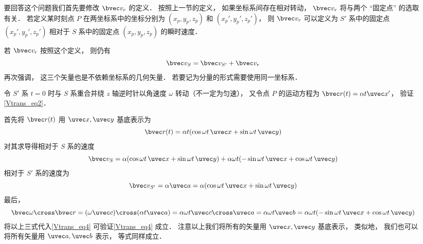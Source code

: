 要回答这个问题我们首先要修改 $\bvec v_r$ 的定义． 按照上一节的定义， 如果坐标系间存在相对转动， $\bvec v_r$ 将与两个 “固定点” 的选取有关． 若定义某时刻点 $P$ 在两坐标系中的坐标分别为 $(x_p, y_p, z_p)$ 和 $(x_p', y_p', z_p')$， 则 $\bvec v_r$ 可以定义为 $S'$ 系中的固定点 $(x_p', y_p', z_p')$ 相对于 $S$ 系中的固定点 $(x_p, y_p, z_p)$ 的瞬时速度．

若 $\bvec v_r$ 按照这个定义， 则仍有
\begin{equation}\label{Vtrans_eq2}
\bvec v_{S} = \bvec v_{S'} + \bvec v_r
\end{equation}
再次强调， 这三个矢量也是不依赖坐标系的几何矢量． 若要记为分量的形式需要使用同一坐标系．

\begin{example}{}
令 $S'$ 系 $t = 0$ 时与 $S$ 系重合并绕 $z$ 轴逆时针以角速度 $\omega$ 转动（不一定为匀速）， 又令点 $P$ 的运动方程为 $\bvec r(t) = \alpha t \uvec x'$， 验证\autoref{Vtrans_eq2}．

首先将 $\bvec r(t)$ 用 $\uvec x, \uvec y$ 基底表示为
\begin{equation}
\bvec r(t) = \alpha t (\cos\omega t\, \uvec x + \sin\omega t\, \uvec y)
\end{equation}
对其求导得相对于 $S$ 系的速度
\begin{equation}
\bvec v_S = \alpha (\cos\omega t \,\uvec x + \sin\omega t \,\uvec y)
+ \alpha\omega t (-\sin\omega t \,\uvec x + \cos\omega t \,\uvec y)
\end{equation}
相对于 $S'$ 系的速度为
\begin{equation}
\bvec v_{S'} = \alpha \uvec a = \alpha (\cos\omega t\, \uvec x + \sin\omega t \,\uvec y)
\end{equation}
最后，
\begin{equation}
\bvec\omega \cross \bvec r = (\omega \uvec c) \cross (\alpha t \uvec a) = \alpha\omega t \uvec c\cross\uvec a = \alpha\omega t \uvec b = \alpha\omega t(-\sin \omega t \,\uvec x + \cos\omega t \,\uvec y)
\end{equation}
将以上三式代入\autoref{Vtrans_eq4} 可验证\autoref{Vtrans_eq4} 成立． 注意以上我们将所有的矢量用 $\uvec x, \uvec y$ 基底表示， 类似地， 我们也可以将所有矢量用 $\uvec a, \uvec b$ 表示， 等式同样成立．
\end{example}
